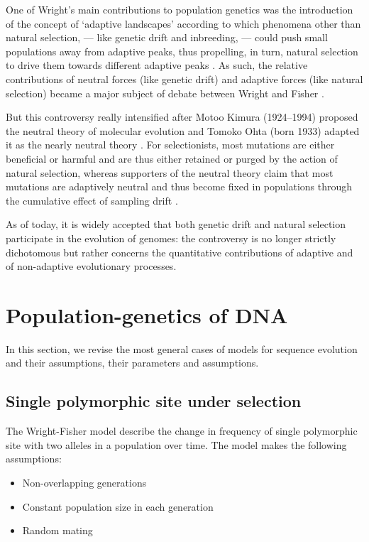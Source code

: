 One of Wright's main contributions to population genetics was the introduction of the concept of ‘adaptive landscapes’ according to which phenomena other than natural selection, — like genetic drift and inbreeding, — could push small populations away from adaptive peaks, thus propelling, in turn, natural selection to drive them towards different adaptive peaks \citep{wright1932roles}.
As such, the relative contributions of neutral forces (like genetic drift) and adaptive forces (like natural selection) became a major subject of debate between Wright and Fisher \citep{plutynski2007drift}.

But this controversy really intensified after Motoo Kimura (1924--1994) proposed the neutral theory of molecular evolution \citep{kimura1968evolutionary,kimura1991neutral,kimura1986dna} and Tomoko Ohta (born 1933) adapted it as the nearly neutral theory \citep{ohta1973slightly}.
For selectionists, most mutations are either beneficial or harmful and are thus either retained or purged by the action of natural selection, whereas supporters of the neutral theory claim that most mutations are adaptively neutral and thus become fixed in populations through the cumulative effect of sampling drift \citep{lewin1996patterns}.

As of today, it is widely accepted that both genetic drift and natural selection participate in the evolution of genomes: the controversy is no longer strictly dichotomous but rather concerns the quantitative contributions of adaptive and of non-adaptive evolutionary processes.

\section{Population-genetics of \acrshort{DNA}}
In this section, we revise the most general cases of models for sequence evolution and their assumptions, their parameters and assumptions.


\subsection*{Single polymorphic site under selection}
The Wright-Fisher model describe the change in frequency of single polymorphic site with two alleles in a population over time. The model makes the following assumptions:
\begin{itemize}
	\setlength\itemsep{-0.2em}
	\item Non-overlapping generations
	\item Constant population size in each generation
	\item Random mating
\end{itemize}


